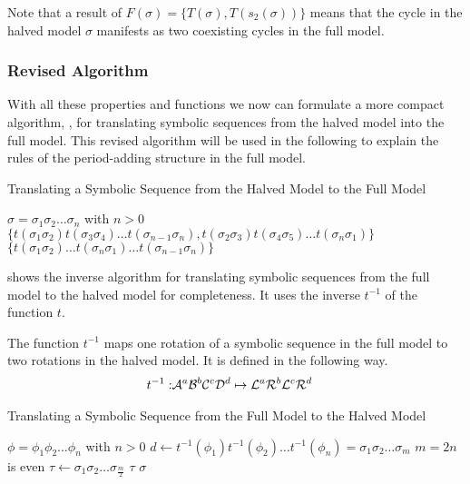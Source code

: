 Note that a result of $F(\sigma) = \{T(\sigma), T(s_2(\sigma))\}$ means that the cycle in the halved model $\sigma$ manifests as two coexisting cycles in the full model.

\subsubsection{Revised Algorithm}

With all these properties and functions we now can formulate a more compact algorithm, , for translating symbolic sequences from the halved model into the full model.
This revised algorithm will be used in the following to explain the rules of the period-adding structure in the full model.

\begin{algorithm}
    \caption{Translating a Symbolic Sequence from the Halved Model to the Full Model}\label{alg:halved.to.full}
    \begin{algorithmic}
        \Require $\sigma = \sigma_1\sigma_2 \dots \sigma_n$ with $n > 0$
        \State \Return $\{t(\sigma_1\sigma_2) t(\sigma_3\sigma_4) \dots t(\sigma_{n-1}\sigma_n), t(\sigma_2\sigma_3) t(\sigma_4\sigma_5) \dots t(\sigma_n\sigma_1)\}$
        \State \Return $\{t(\sigma_1\sigma_2) \dots t(\sigma_{n}\sigma_1) \dots t(\sigma_{n-1}\sigma_n)\}$
        \EndIf
    \end{algorithmic}
\end{algorithm}

 shows the inverse algorithm for translating symbolic sequences from the full model to the halved model for completeness.
It uses the inverse $t^{-1}$ of the function $t$.

\begin{definition}
    The function $t^{-1}$ maps one rotation of a symbolic sequence in the full model to two rotations in the halved model.
    It is defined in the following way.
    \begin{align}
        t^{-1}: & \mathcal{A}^a\mathcal{B}^b\mathcal{C}^c\mathcal{D}^d \mapsto \mathcal{L}^a\mathcal{R}^b\mathcal{L}^c\mathcal{R}^d
    \end{align}
\end{definition}

\begin{algorithm}
    \caption{Translating a Symbolic Sequence from the Full Model to the Halved Model}\label{alg:full.to.halved}
    \begin{algorithmic}
        \Require $\phi = \phi_1\phi_2 \dots \phi_n$ with $n > 0$
        \State $d \gets t^{-1}(\phi_1)t^{-1}(\phi_2) \dots t^{-1}(\phi_n) = \sigma_1\sigma_2 \dots \sigma_m$
        \Comment $m = 2n$ is even
        \State $\tau \gets \sigma_1\sigma_2 \dots \sigma_{\frac{m}{2}}$
        \State \Return $\tau$
        \State \Return $\sigma$
        \EndIf
    \end{algorithmic}
\end{algorithm}
